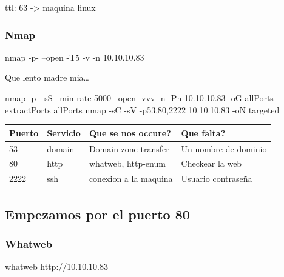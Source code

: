 \documentclass{assets/ipesethesis}
\newenvironment{Shaded}{\begin{snugshade}}{\end{snugshade}}
\newcommand{\ExtensionTok}[1]{#1}
\newcommand{\FunctionTok}[1]{\textcolor[rgb]{0.00,0.00,0.00}{#1}}
\newcommand{\NormalTok}[1]{#1}
\begin{document}
ttl: 63 -\textgreater{} maquina linux

\hypertarget{nmap}{%
\subsubsection*{Nmap}\label{nmap}}

\begin{Shaded}
\begin{Highlighting}[]
\FunctionTok{nmap}\NormalTok{ -p- --open -T5 -v -n 10.10.10.83}
\end{Highlighting}
\end{Shaded}

Que lento madre mia\ldots{}

\begin{Shaded}
\begin{Highlighting}[]
\FunctionTok{nmap}\NormalTok{ -p- -sS --min-rate 5000 --open -vvv -n -Pn 10.10.10.83 -oG allPorts}
\ExtensionTok{extractPorts}\NormalTok{ allPorts}
\FunctionTok{nmap}\NormalTok{ -sC -sV -p53,80,2222 10.10.10.83 -oN targeted}
\end{Highlighting}
\end{Shaded}

\begin{longtable}[]{@{}llll@{}}
\toprule
Puerto & Servicio & Que se nos occure? & Que falta?\tabularnewline
\midrule
\endhead
53 & domain & Domain zone transfer & Un nombre de dominio\tabularnewline
80 & http & whatweb, http-enum & Checkear la web\tabularnewline
2222 & ssh & conexion a la maquina & Usuario contraseña\tabularnewline
\bottomrule
\end{longtable}

\hypertarget{empezamos-por-el-puerto-80}{%
\subsection*{Empezamos por el puerto 80}\label{empezamos-por-el-puerto-80}}

\hypertarget{whatweb}{%
\subsubsection*{Whatweb}\label{whatweb}}

\begin{Shaded}
\begin{Highlighting}[]
\ExtensionTok{whatweb}\NormalTok{ http://10.10.10.83}
\end{Highlighting}
\end{Shaded}
\end{document}
